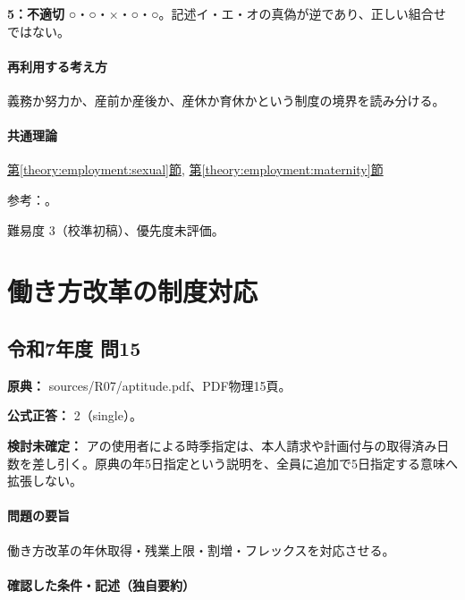\noindent\textbf{5：不適切} ○・○・×・○・○。記述イ・エ・オの真偽が逆であり、正しい組合せではない。\par

\paragraph{再利用する考え方} 義務か努力か、産前か産後か、産休か育休かという制度の境界を読み分ける。

\paragraph{共通理論} \hyperref[theory:employment:sexual]{第\ref*{theory:employment:sexual}節}, \hyperref[theory:employment:maternity]{第\ref*{theory:employment:maternity}節}

\par 参考：\cite{employment_sexual_current,employment_sexual2018,employment_sexual2018,employment_maternity_current,employment_maternity2014}。

\par 難易度 3（校準初稿）、優先度未評価。

\section{働き方改革の制度対応}

\subsection{令和7年度 問15}
\label{q:r07-reg-apt-15}

\noindent\textbf{原典：} sources/R07/aptitude.pdf、PDF物理15頁。

\textbf{公式正答：} 2（single）。

\par\textbf{検討未確定：} アの使用者による時季指定は、本人請求や計画付与の取得済み日数を差し引く。原典の年5日指定という説明を、全員に追加で5日指定する意味へ拡張しない。

\paragraph{問題の要旨} 働き方改革の年休取得・残業上限・割増・フレックスを対応させる。

\paragraph{確認した条件・記述（独自要約）}\mbox{}\par

